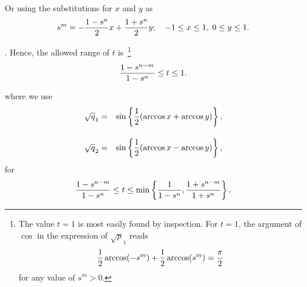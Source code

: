 \documentclass[aps,prl,twocolumn,eqsecnum,showpacs]{revtex4}
\begin{document}
Or using the substitutions for $x$ and $y$ as
\begin{equation}
s^m=-{1-s^n\over 2}x+{1+s^n\over2}y;\quad -1\le x\le1,\; 0\le y\le 1.
\end{equation}

. Hence, the allowed range of $t$ is~\footnote{The value $t=1$ is most easily found by inspection. For $t=1$, the argument of $\cos$ in the expression of $\sqrt p_1$ reads 
$$
{1\over2}\arccos(-s^m)+{1\over2}\arccos(s^m)={\pi\over2}
$$
for any value of $s^m>0$.
}
$$
{1-s^{n-m}\over 1-s^n}\le t\le  1.
$$

 where we use
\begin{eqnarray}
\sqrt q_1&=&\sin\left\{{1\over2}(\arccos{x}+\arccos{y})\right\},\\[1em]
\sqrt q_2&=&\sin\left\{{1\over2}(\arccos{x}-\arccos{y})\right\},
\end{eqnarray}
for
$$
{1-s^{n-m}\over 1-s^n}\le t\le \min\left\{{1\over1-s^n},{1+s^{n-m}\over1+s^n}\right\}.
$$
\end{document}
